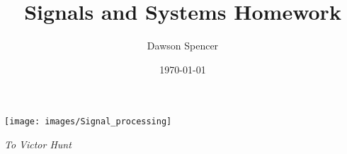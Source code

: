 \documentclass[12pt]{article}
\begin{document}
    \title{Signals and Systems Homework}
    \author{Dawson Spencer}
    \date{\today}
    \maketitle

    \begin{center}
        \texttt{[image: images/Signal\_processing]}
    \end{center}

    \vspace{1em}

    \begin{center}
        \textit{To Victor Hunt}
    \end{center}
\end{document}
